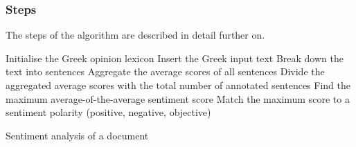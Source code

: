 \clearpage

\subsubsection{Steps}
\label{subsubsec:steps}

The steps of the algorithm are described in detail further on.

\hfill

\begin{algorithm}[H]
\SetAlgoLined
{}
 Initialise the Greek opinion lexicon\;
 Insert the Greek input text\;
 Break down the text into sentences\;
 Aggregate the average scores of all sentences\;
 Divide the aggregated average scores with the total number of annotated sentences\;
 Find the maximum average-of-the-average sentiment score\;
 Match the maximum score to a sentiment polarity (positive, negative, objective)\;
 \caption{Sentiment analysis of a document}
\end{algorithm}
